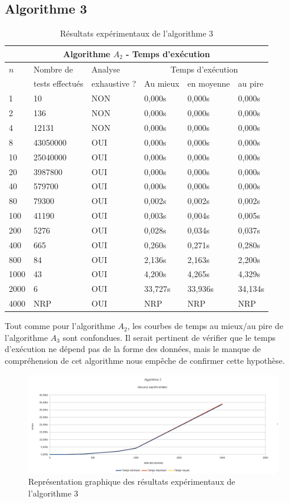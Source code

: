 \subsection{Algorithme 3}
\begin{table}[p]
{%
\begin{center}
\begin{tabular}{||p{1cm}||p{2.5cm}|p{2.5cm}|p{2.5cm}|p{2.5cm}|p{2.5cm}||}
\hline\hline
\multicolumn{6}{||c||}{Algorithme $A_2$ - Temps d'exécution}\\\hline\hline
$n$ & Nombre de & Analyse& \multicolumn{3}{c||}{Temps d'exécution}\\
& tests effectués & exhaustive ?  &Au mieux&en moyenne&au pire\\\hline\hline

1 & 10 & NON & 0,000s & 0,000s & 0,000s\\
2 & 136 & NON & 0,000s & 0,000s & 0,000s\\
4 & 12131 & NON & 0,000s & 0,000s & 0,000s\\
8 & 43050000 & OUI & 0,000s & 0,000s & 0,000s\\
10 & 25040000 & OUI & 0,000s & 0,000s & 0,000s\\
20 & 3987800 & OUI & 0,000s & 0,000s & 0,000s\\
40 & 579700 & OUI & 0,000s & 0,000s & 0,000s\\
80 & 79300 & OUI & 0,002s & 0,002s & 0,002s\\
100 & 41190 & OUI & 0,003s & 0,004s & 0,005s\\
200 & 5276 & OUI & 0,028s & 0,034s & 0,037s\\
400 & 665 & OUI & 0,260s & 0,271s & 0,280s\\
800 & 84 & OUI & 2,136s & 2,163s & 2,200s\\
1000 & 43 & OUI & 4,200s & 4,265s & 4,329s\\
2000 & 6 & OUI & 33,727s & 33,936s & 34,134s\\
4000 & NRP & OUI & NRP & NRP & NRP\\\hline\hline
\end{tabular}

\caption{Résultats expérimentaux de l'algorithme 3}

\label{tab3}
\end{center}
}%
\end{table}
Tout comme pour l'algorithme $A_2$, les courbes de temps au mieux/au pire de l'algorithme $A_3$ sont confondues. 
Il serait pertinent de vérifier que le temps d'exécution ne dépend pas de la forme des données, mais le manque de compréhension de cet algorithme nous empêche de confirmer cette hypothèse.
\begin{figure}[p]
  \includegraphics[width=\textwidth]{expe_algo3}
  \caption{Représentation graphique des résultats expérimentaux de l'algorithme 3}
    \label{graphalgo3}
\end{figure}